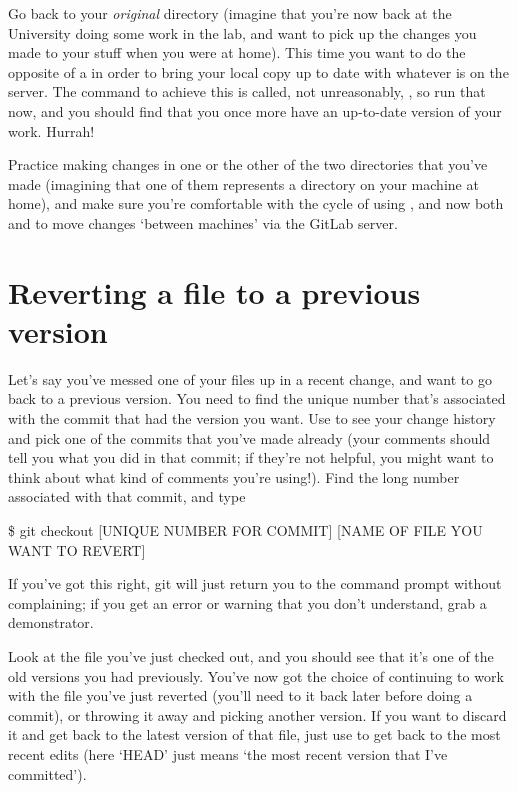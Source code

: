 Go back to your \emph{original}  directory (imagine that you're now back at the University doing some work in the lab, and want to pick up the changes you made to your stuff when you were at home). This time you want to do the opposite of a  in order to bring your local copy up to date with whatever is on the server. The command to achieve this is called, not unreasonably, , so run that now, and you should find that you once more have an up-to-date version of your work. Hurrah!

Practice making changes in one or the other of the two  directories that you've made (imagining that one of them represents a directory on your machine at home), and make sure you're comfortable with the cycle of using ,  and now both  and  to move changes `between machines' via the GitLab server.

\section{Reverting a file to a previous version}

Let's say you've messed one of your files up in a recent change, and want to go back to a previous version. You need to find the unique number that's associated with the commit that had the version you want. Use  to see your change history and pick one of the commits that you've made already (your comments should tell you what you did in that commit; if they're not helpful, you might want to think about what kind of comments you're using!). Find the long number associated with that commit, and type

\begin{ttoutenv}
\$ git checkout [UNIQUE NUMBER FOR COMMIT] [NAME OF FILE YOU WANT TO REVERT]
\end{ttoutenv}

If you've got this right, git will just return you to the command prompt without complaining; if you get an error or warning that you don't understand, grab a demonstrator. 

Look at the file you've just checked out, and you should see that it's one of the old versions you had previously. You've now got the choice of continuing to work with the file you've just reverted (you'll need to  it back later before doing a commit), or throwing it away and picking another version. If you want to discard it and get back to the latest version of that file, just use  to get back to the most recent edits (here `HEAD' just means `the most recent version that I've committed').


